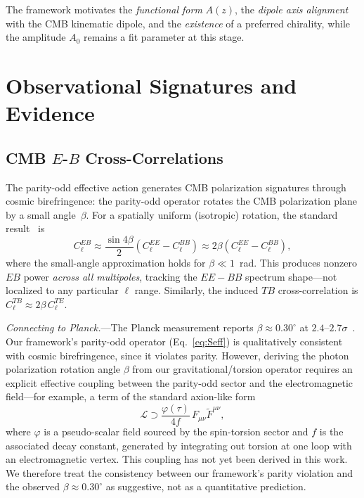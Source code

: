 \documentclass[aps,prd,twocolumn,superscriptaddress,showpacs,preprintnumbers,nofootinbib,longbibliography,floatfix]{revtex4-2}
\begin{document}
The framework motivates the \textit{functional form} $A(z)$, the \textit{dipole axis alignment} with the CMB kinematic dipole, and the \textit{existence} of a preferred chirality, while the amplitude $A_0$ remains a fit parameter at this stage.


\section{Observational Signatures and Evidence}\label{sec:obs}

\subsection{CMB $E$-$B$ Cross-Correlations}\label{sec:EB}

The parity-odd effective action generates CMB polarization signatures through cosmic birefringence: the parity-odd operator rotates the CMB polarization plane by a small angle~$\beta$. For a spatially uniform (isotropic) rotation, the standard result~\cite{Minami2020} is
\begin{equation}\label{eq:ClEB}
C_\ell^{EB}\approx \frac{\sin 4\beta}{2}\left(C_\ell^{EE}-C_\ell^{BB}\right) \approx 2\beta\left(C_\ell^{EE}-C_\ell^{BB}\right),
\end{equation}
where the small-angle approximation holds for $\beta\ll 1$~rad. This produces nonzero $EB$ power \textit{across all multipoles}, tracking the $EE-BB$ spectrum shape---not localized to any particular $\ell$ range. Similarly, the induced $TB$ cross-correlation is $C_\ell^{TB}\approx 2\beta\,C_\ell^{TE}$.

\textit{Connecting to Planck.}---The Planck measurement reports $\beta \approx 0.30^\circ$ at $2.4$--$2.7\sigma$~\cite{Minami2020,Eskilt2022}. Our framework's parity-odd operator (Eq.~\ref{eq:Seff}) is qualitatively consistent with cosmic birefringence, since it violates parity. However, deriving the photon polarization rotation angle $\beta$ from our gravitational/torsion operator requires an explicit effective coupling between the parity-odd sector and the electromagnetic field---for example, a term of the standard axion-like form
\begin{equation}\label{eq:axionFF}
\mathcal{L}\supset \frac{\varphi(\tau)}{4f}\,F_{\mu\nu}\tilde{F}^{\mu\nu},
\end{equation}
where $\varphi$ is a pseudo-scalar field sourced by the spin-torsion sector and $f$ is the associated decay constant, generated by integrating out torsion at one loop with an electromagnetic vertex. This coupling has not yet been derived in this work. We therefore treat the consistency between our framework's parity violation and the observed $\beta\approx 0.30^\circ$ as suggestive, not as a quantitative prediction.
\end{document}
